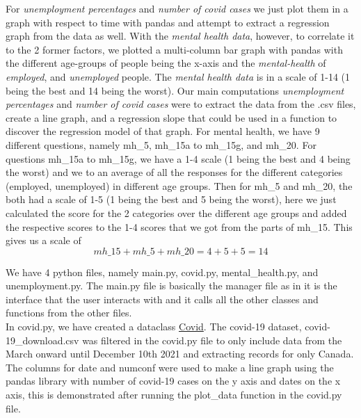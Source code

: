 \documentclass[fontsize=11pt]{article}
\begin{document}
    For \emph{unemployment percentages} and \emph{number of covid cases} we just plot them in a graph with respect to time with pandas and attempt to extract a regression graph from the data as well. With the \emph{mental health data}, however, to correlate it to the 2 former factors, we plotted a multi-column bar graph with pandas with the different age-groups of people being the x-axis and the \emph{mental-health} of \emph{employed}, and \emph{unemployed} people. The \emph{mental health data} is in a scale of 1-14 (1 being the best and 14 being the worst).
    Our main computations \emph{unemployment percentages} and \emph{number of covid cases} were to extract the data from the .csv files, create a line graph, and a regression slope that could be used in a function to discover the regression model of that graph. For mental health, we have 9 different questions, namely mh\_5, mh\_15a to mh\_15g, and mh\_20. For questions mh\_15a to mh\_15g, we have a 1-4 scale (1 being the best and 4 being the worst) and we to an average of all the responses for the different categories (employed, unemployed) in different age groups. Then for mh\_5 and mh\_20, the both had a scale of 1-5 (1 being the best and 5 being the worst), here we just calculated the score for the 2 categories over the different age groups and added the respective scores to the 1-4 scores that we got from the parts of mh\_15. This gives us a scale of
    $$mh\_15 + mh\_5 + mh\_20 = 4 + 5 + 5 = 14$$
    
    We have 4 python files, namely main.py, covid.py, mental\_health.py, and unemployment.py. The main.py file is basically the manager file as in it is the interface that the user interacts with and it calls all the other classes and functions from the other files.\\
    
    In covid.py, we have created a dataclass \underline{Covid}. The covid-19 dataset, covid-19\_download.csv was filtered in the covid.py file to only include data from the March onward until December 10th 2021 and extracting records for only Canada. The columns for date and numconf were used to make a line graph using the pandas library with number of covid-19 cases on the y axis and dates on the x axis, this is demonstrated after running the plot\_data function in the covid.py file. \\
    \\
\end{document}
